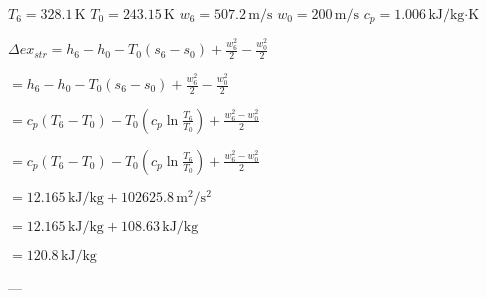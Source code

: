 \( T_6 = 328.1 \, \text{K} \)  
\( T_0 = 243.15 \, \text{K} \)  
\( w_6 = 507.2 \, \text{m/s} \)  
\( w_0 = 200 \, \text{m/s} \)  
\( c_p = 1.006 \, \text{kJ/kg·K} \)  

\( \Delta ex_{str} = h_6 - h_0 - T_0 (s_6 - s_0) + \frac{w_6^2}{2} - \frac{w_0^2}{2} \)  

\( = h_6 - h_0 - T_0 (s_6 - s_0) + \frac{w_6^2}{2} - \frac{w_0^2}{2} \)  

\( = c_p (T_6 - T_0) - T_0 \left( c_p \ln \frac{T_6}{T_0} \right) + \frac{w_6^2 - w_0^2}{2} \)  

\( = c_p (T_6 - T_0) - T_0 \left( c_p \ln \frac{T_6}{T_0} \right) + \frac{w_6^2 - w_0^2}{2} \)  

\( = 12.165 \, \text{kJ/kg} + 102625.8 \, \text{m}^2/\text{s}^2 \)  

\( = 12.165 \, \text{kJ/kg} + 108.63 \, \text{kJ/kg} \)  

\( = 120.8 \, \text{kJ/kg} \)  

---